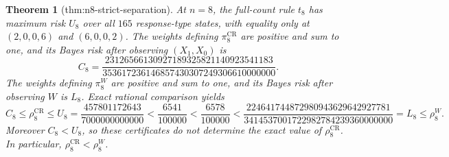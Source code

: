 \documentclass{article}
\newtheorem{theorem}{Theorem}
\begin{document}
\begin{theorem}[thm:n8-strict-separation]\label{thm:n8-strict-separation}
At \(n=8\), the full-count rule \(t_8\) has maximum risk \(U_8\) over all \(165\) response-type states, with equality only at \((2,0,0,6)\) and \((6,0,0,2)\).  The weights defining \(\pi_8^{\mathrm{CR}}\) are positive and sum to one, and its Bayes risk after observing \((X_1,X_0)\) is
\[
 C_8=\frac{23126566130927189325821140923541183}
 {353617236146857430307249306610000000}.
\]
The weights defining \(\pi_8^W\) are positive and sum to one, and its Bayes risk after observing \(W\) is \(L_8\).  Exact rational comparison yields
\[
 C_8\leq\rho_8^{\mathrm{CR}}\leq U_8
 =\frac{457801172643}{7000000000000}
 <\frac{6541}{100000}<\frac{6578}{100000}
 <\frac{224641744872980943629642927781}
 {3414537001722982784239360000000}
 =L_8\leq\rho_8^W.
\]
Moreover \(C_8<U_8\), so these certificates do not determine the exact value of \(\rho_8^{\mathrm{CR}}\).  In particular, \(\rho_8^{\mathrm{CR}}<\rho_8^W\).
\end{theorem}
\end{document}

